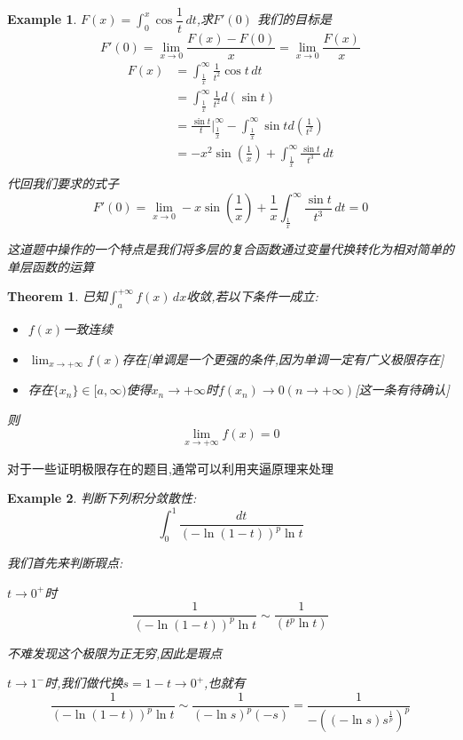 \documentclass[11pt,hyperref,a4paper,UTF8]{ctexart}
\newtheorem{theorem}{Theorem}[subsection]
\newtheorem{example}{Example}[subsection]
\newcommand{\parameter}[1]{\left(#1\right)}
\begin{document}
\begin{CJK}{UTF8}{gkai}
\begin{example}
  $F(x) = \int_{0}^{x}\cos \dfrac{1}{t}\, dt$,求$F'(0)$
  我们的目标是
  \[ F'(0) = \lim_{x \to 0} \frac{F(x) - F(0)}{x} = \lim_{x \to 0} \frac{F(x)}{x}\]
  \[
  \begin{aligned}  
    F(x)&=\int_{\frac{1}{x}}^{\infty}\frac{1}{t^2} \cos t\, dt\\
    &= \int_{\frac{1}{x}}^{\infty}\frac{1}{t^2}d(\sin t)\\
    &= \frac{\sin t}{t}|^\infty_{\frac{1}{x}} - \int_{\frac{1}{x}}^{\infty} \sin t d(\frac{1}{t^2})\\
    &= -x^2 \sin \parameter{\frac{1}{x}} +  \int_{\frac{1}{x}}^{\infty}  \frac{\sin t}{t^3}\, dt\\
  \end{aligned}  
  \]
  代回我们要求的式子
  \[ F'(0) = \lim_{x \to 0} -x \sin \parameter{\frac{1}{x}} +  \frac{1}{x}\int_{\frac{1}{x}}^{\infty}  \frac{\sin t}{t^3}\, dt = 0\]

  这道题中操作的一个特点是我们将多层的复合函数通过变量代换转化为相对简单的单层函数的运算
\end{example}

\begin{theorem}
  已知$\int_{a}^{+\infty} f(x)\, dx$收敛,若以下条件一成立:
  \begin{itemize}
    \item $f(x)$一致连续
    \item $\lim_{x\to +\infty}f(x)$存在[单调是一个更强的条件,因为单调一定有广义极限存在]
    \item 存在$\{x_n\} \in [a,\infty)$使得$x_n\to +\infty$时$f(x_n) \to 0(n\to +\infty)$[这一条有待确认]
  \end{itemize}
  则
  \[\lim_{x\to +\infty} f(x) = 0\]
\end{theorem}

对于一些证明极限存在的题目,通常可以利用夹逼原理来处理

\begin{example}
  判断下列积分敛散性:
  \[\int_{0}^{1}\frac{dt}{\parameter{-\ln(1 - t)}^p \ln t}\]

  我们首先来判断瑕点:

  $t \to 0^+$时
  \[\frac{1}{\parameter{-\ln(1 - t)}^p \ln t} \sim \frac{1}{\parameter{t^p \ln t}}\]

  不难发现这个极限为正无穷,因此是瑕点

  $t \to 1^-$时,我们做代换$s = 1 - t \to 0^+$,也就有
  \[\frac{1}{\parameter{-\ln(1 - t)}^p \ln t} \sim \frac{1}{(-\ln s)^p (-s)} =  \frac{1}{-\parameter{(-\ln s) s^\frac{1}{p}}^p}\]


\end{example}
\end{CJK}
\end{document}
